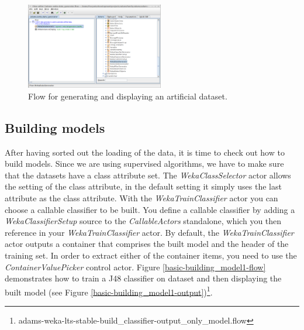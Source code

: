 \begin{figure}[htb]
  \centering
  \includegraphics[width=6.0cm]{images/basic-datagenerator.png}
  \caption{Flow for generating and displaying an artificial dataset.}
  \label{basic-datagenerator}
\end{figure}

\subsection{Building models}
After having sorted out the loading of the data, it is time to check out how to
build models. Since we are using supervised algorithms, we have to make sure
that the datasets have a class attribute set. The \textit{WekaClassSelector}
actor allows the setting of the class attribute, in the default setting it
simply uses the last attribute as the class attribute. With the
\textit{WekaTrainClassifier} actor you can choose a callable classifier to be built. 
You define a callable classifier by adding a \textit{WekaClassifierSetup} source
to the \textit{CallableActors} standalone, which you then reference in your 
\textit{WekaTrainClassifier} actor.
By default, the \textit{WekaTrainClassifier} actor outputs a container that comprises
the built model and the header of the training set. In order to extract either
of the container items, you need to use the \textit{ContainerValuePicker}
control actor. Figure \ref{basic-building_model1-flow} demonstrates how to train
a J48 classifier on dataset and then displaying the built model (see Figure
\ref{basic-building_model1-output})\footnote{adams-weka-lts-stable-build\_classifier-output\_only\_model.flow}.


